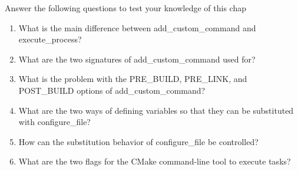 Answer the following questions to test your knowledge of this chap

\begin{enumerate}
\item 
What is the main difference between add\_custom\_command and execute\_process?

\item 
What are the two signatures of add\_custom\_command used for?

\item 
What is the problem with the PRE\_BUILD, PRE\_LINK, and POST\_BUILD options of add\_custom\_command?

\item 
What are the two ways of defining variables so that they can be substituted with configure\_file?

\item 
How can the substitution behavior of configure\_file be controlled?

\item 
What are the two flags for the CMake command-line tool to execute tasks?
\end{enumerate}
